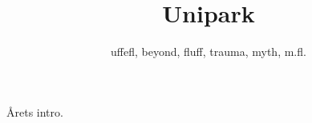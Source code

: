\documentclass[danish]{article}
\title{Unipark}
\author{uffefl, beyond, fluff, trauma, myth, m.fl.}
\begin{document}
\maketitle

Årets intro.
\end{document}
